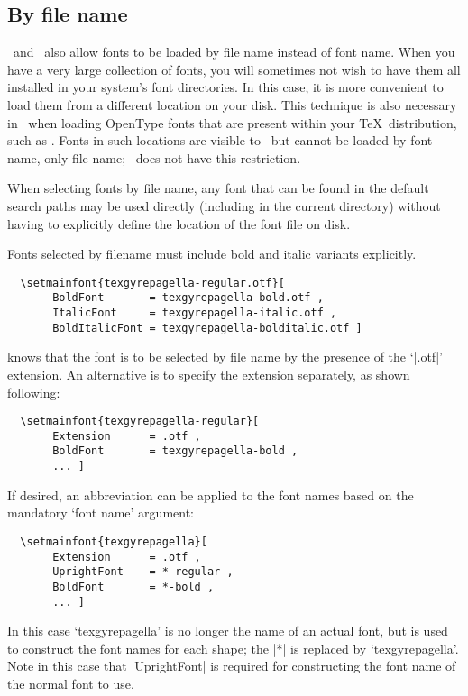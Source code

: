 \subsection{By file name}
\label{sec:by-file-name}

\XeTeX\ and \LuaTeX\ also allow fonts to be loaded by file name instead of font name.
When you have a very large collection of fonts, you will sometimes not
wish to have them all installed in your system's font directories.
In this case, it is more convenient to load them from a different location on your disk.
This technique is also necessary in \XeTeX\ when loading OpenType fonts that are present within your \TeX\ distribution, such as .
Fonts in such locations are visible to \XeTeX\ but cannot be loaded by font name, only file name; \LuaTeX\ does not have this restriction.

When selecting fonts by file name, any font that can be found in the default
search paths may be used directly (including in the current directory)
without having to explicitly define the location of the font file on disk.

Fonts selected by filename must include bold and italic variants explicitly.
\begin{Verbatim}
  \setmainfont{texgyrepagella-regular.otf}[
       BoldFont       = texgyrepagella-bold.otf ,
       ItalicFont     = texgyrepagella-italic.otf ,
       BoldItalicFont = texgyrepagella-bolditalic.otf ]
\end{Verbatim}
 knows that the font is to be selected by file name by the
presence of the `|.otf|' extension.
An alternative is to specify the extension separately, as shown following:
\begin{Verbatim}
  \setmainfont{texgyrepagella-regular}[
       Extension      = .otf ,
       BoldFont       = texgyrepagella-bold ,
       ... ]
\end{Verbatim}
If desired, an abbreviation can be applied to the font names based on the
mandatory `font name' argument:
\begin{Verbatim}
  \setmainfont{texgyrepagella}[
       Extension      = .otf ,
       UprightFont    = *-regular ,
       BoldFont       = *-bold ,
       ... ]
\end{Verbatim}
In this case `texgyrepagella' is no longer the name of an actual font,
but is used to construct the font names for each shape;
the |*| is replaced by `texgyrepagella'.
Note in this case that |UprightFont| is required for constructing the font
name of the normal font to use.


